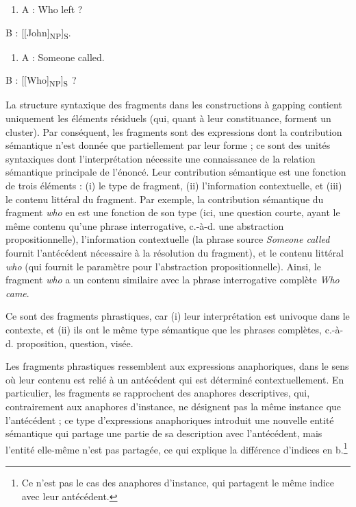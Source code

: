 \begin{enumerate}
\item \label{bkm:Ref290576352}A :   Who left ? 


\end{enumerate}
  B :  [[John]\textsubscript{NP}]\textsubscript{S}. 


\begin{enumerate}
\item \label{bkm:Ref290576354}A :   Someone called. 


\end{enumerate}
  B :  [[Who]\textsubscript{NP}]\textsubscript{S~}?  

La structure syntaxique des fragments dans les constructions à gapping contient uniquement les éléments résiduels (qui, quant à leur constituance, forment un cluster). Par conséquent, les fragments sont des expressions dont la contribution sémantique n'est donnée que partiellement par leur forme ; ce sont des unités syntaxiques dont l'interprétation nécessite une connaissance de la relation sémantique principale de l'énoncé. Leur contribution sémantique est une fonction de trois éléments : (i) le type de fragment, (ii) l'information contextuelle, et (iii) le contenu littéral du fragment. Par exemple, la contribution sémantique du fragment \textit{who} en  est une fonction de son type (ici, une question courte, ayant le même contenu qu'une phrase interrogative, c.-à-d. une abstraction propositionnelle), l'information contextuelle (la phrase source \textit{Someone called} fournit l'antécédent nécessaire à la résolution du fragment), et le contenu littéral \textit{who} (qui fournit le paramètre pour l'abstraction propositionnelle). Ainsi, le fragment \textit{who} a un contenu similaire avec la phrase interrogative complète \textit{Who came}.

Ce sont des fragments phrastiques, car (i) leur interprétation est univoque dans le contexte, et (ii) ils ont le même type sémantique que les phrases complètes, c.-à-d. proposition, question, visée.

Les fragments phrastiques ressemblent aux expressions anaphoriques, dans le sens où leur contenu est relié à un antécédent qui est déterminé contextuellement. En particulier, les fragments se rapprochent des anaphores descriptives, qui, contrairement aux anaphores d'instance, ne désignent pas la même instance que l'antécédent ; ce type d'expressions anaphoriques introduit une nouvelle entité sémantique qui partage une partie de sa description avec l'antécédent, mais l'entité elle-même n'est pas partagée, ce qui explique la différence d'indices en b.\footnote{Ce n'est pas le cas des anaphores d'instance, qui partagent le même indice avec leur antécédent.}


